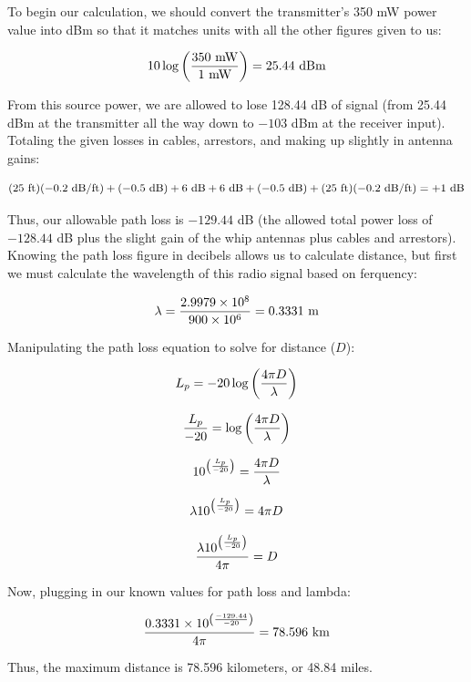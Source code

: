 To begin our calculation, we should convert the transmitter's 350 mW power value into dBm so that it matches units with all the other figures given to us:

$$10 \log \left(350 \hbox{ mW} \over 1 \hbox{ mW}\right) = 25.44 \hbox{ dBm}$$

From this source power, we are allowed to lose 128.44 dB of signal (from 25.44 dBm at the transmitter all the way down to $-103$ dBm at the receiver input).  Totaling the given losses in cables, arrestors, and making up slightly in antenna gains:

$$(25 \hbox{ ft})(-0.2 \hbox{ dB/ft}) + (-0.5 \hbox{ dB}) + 6 \hbox{ dB} + 6 \hbox{ dB} + (-0.5 \hbox{ dB}) + (25 \hbox{ ft})(-0.2 \hbox{ dB/ft}) = +1 \hbox{ dB}$$

Thus, our allowable path loss is $-129.44$ dB (the allowed total power loss of $-128.44$ dB plus the slight gain of the whip antennas plus cables and arrestors).  Knowing the path loss figure in decibels allows us to calculate distance, but first we must calculate the wavelength of this radio signal based on ferquency:

$$\lambda = {2.9979 \times 10^8 \over 900 \times 10^6} = 0.3331 \hbox{ m}$$

\filbreak

Manipulating the path loss equation to solve for distance ($D$):

$$L_p = -20 \log \left( 4 \pi D \over \lambda \right)$$

$${L_p \over -20} = \log \left( 4 \pi D \over \lambda \right)$$

$$10^{\left({L_p \over -20}\right)} = {4 \pi D \over \lambda}$$

$$\lambda 10^{\left({L_p \over -20}\right)} = 4 \pi D$$

$${{\lambda 10^{\left({L_p \over -20}\right)}} \over 4 \pi} = D$$

Now, plugging in our known values for path loss and lambda:

$${{0.3331 \times 10^{\left({-129.44 \over -20}\right)}} \over 4 \pi} = 78.596 \hbox{ km}$$

\vskip 10pt

Thus, the maximum distance is 78.596 kilometers, or 48.84 miles.




